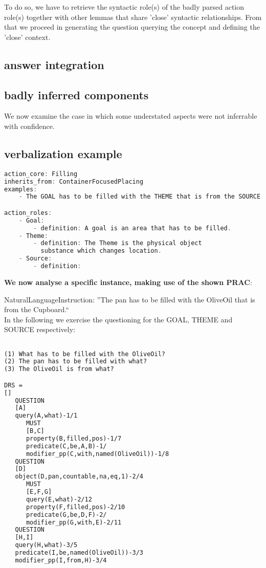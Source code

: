 \documentclass[10pt,a4paper]{article}
\begin{document}
To do so, we have to retrieve the syntactic role(s) of the badly parsed action role(s) together with other lemmas 
that share 'close' syntactic relationships.
From that we proceed in generating the question querying the concept and defining the 'close' context.

\subsection{answer integration}

\subsection{badly inferred components}
We now examine the case in which some understated aspects were not inferrable with confidence.

\newpage
\appendix
\subsection{verbalization example}
{\small
\begin{lstlisting}[language=c,label=firstlook,caption=serialized PRAC of the verb 'Filling']
action_core: Filling
inherits_from: ContainerFocusedPlacing
examples:
    - The GOAL has to be filled with the THEME that is from the SOURCE.

action_roles:
    - Goal:
        - definition: A goal is an area that has to be filled.
    - Theme:
        - definition: The Theme is the physical object 
          substance which changes location. 
    - Source:
        - definition: 
\end{lstlisting}
\textbf{We now analyse a specific instance, making use of the shown PRAC}:\\

\parbox[c]{800px}{
NaturalLanguageInstruction: ''The pan has to be filled with the OliveOil that is from the Cupboard.``\\
In the following we exercise the questioning for the GOAL, THEME and SOURCE respectively:	
}

\begin{lstlisting}[language=HTML,label=firstlook,caption=ACE questions and resulting DRS]

(1) What has to be filled with the OliveOil?
(2) The pan has to be filled with what?
(3) The OliveOil is from what? 

DRS = 
[]
   QUESTION
   [A]
   query(A,what)-1/1
      MUST
      [B,C]
      property(B,filled,pos)-1/7
      predicate(C,be,A,B)-1/
      modifier_pp(C,with,named(OliveOil))-1/8
   QUESTION
   [D]
   object(D,pan,countable,na,eq,1)-2/4
      MUST
      [E,F,G]
      query(E,what)-2/12
      property(F,filled,pos)-2/10
      predicate(G,be,D,F)-2/
      modifier_pp(G,with,E)-2/11
   QUESTION
   [H,I]
   query(H,what)-3/5
   predicate(I,be,named(OliveOil))-3/3
   modifier_pp(I,from,H)-3/4

\end{lstlisting}
}
\end{document}
